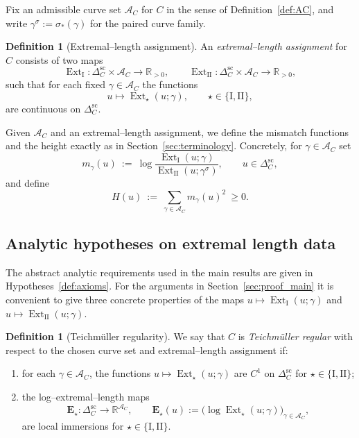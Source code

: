 \documentclass[a4paper,12pt]{amsart}
\newcommand{\R}{\mathbb{R}}
\DeclareMathOperator{\Ext}{Ext}
\theoremstyle{plain}
\theoremstyle{definition}
\newtheorem{definition}[theorem]{Definition}
\begin{document}
\noindent
Fix an admissible curve set $\mathcal A_C$ for $C$ in the sense of Definition~\ref{def:AC}, and write
$\gamma^\sigma:=\sigma_\ast(\gamma)$ for the paired curve family.


\begin{definition}[Extremal--length assignment]\label{def:ExtAssign}
An \emph{extremal--length assignment} for $C$ consists of two maps
\[
\Ext_{\mathrm{I}}:\Delta_C^{\mathrm{sc}}\times \mathcal A_C\longrightarrow \R_{>0},
\qquad
\Ext_{\mathrm{II}}:\Delta_C^{\mathrm{sc}}\times \mathcal A_C\longrightarrow \R_{>0},
\]
such that for each fixed $\gamma\in\mathcal A_C$ the functions
\[
u\longmapsto \Ext_{\star}(u;\gamma),\qquad \star\in\{\mathrm{I},\mathrm{II}\},
\]
are continuous on $\Delta_C^{\mathrm{sc}}$.
\end{definition}

Given $\mathcal A_C$ and an extremal--length assignment, we define the mismatch functions and the height exactly as in
Section~\ref{sec:terminology}.  Concretely, for $\gamma\in\mathcal A_C$ set
\[
m_\gamma(u)\ :=\ \log\frac{\Ext_{\mathrm{I}}(u;\gamma)}{\Ext_{\mathrm{II}}(u;\gamma^\sigma)},
\qquad u\in\Delta_C^{\mathrm{sc}},
\]
and define
\[
H(u)\ :=\ \sum_{\gamma\in\mathcal A_C} m_\gamma(u)^2\ \ge 0 .
\]

\subsection{Analytic hypotheses on extremal length data}\label{subsec:C_axioms}

The abstract analytic requirements used in the main results are given in Hypotheses~\ref{def:axioms}.
For the arguments in Section~\ref{sec:proof_main} it is convenient to give three concrete properties of the maps
$u\mapsto \Ext_{\mathrm{I}}(u;\gamma)$ and $u\mapsto \Ext_{\mathrm{II}}(u;\gamma)$.

\begin{definition}[Teichm\"uller regularity]\label{def:TeichReg}
We say that $C$ is \emph{Teichm\"uller regular} with respect to the chosen curve set and extremal--length assignment if:
\begin{enumerate}[label=\textup{(R\arabic*)}, leftmargin=2.8em]
\item for each $\gamma\in\mathcal A_C$, the functions $u\longmapsto \Ext_{\star}(u;\gamma)$ are $C^1$ on $\Delta_C^{\mathrm{sc}}$ for
$\star\in\{\mathrm{I},\mathrm{II}\}$;
\item the log--extremal--length maps
\[
\mathbf{E}_{\star}:\Delta_C^{\mathrm{sc}}\longrightarrow \R^{\mathcal A_C},\qquad
\mathbf{E}_{\star}(u):=\bigl(\log \Ext_{\star}(u;\gamma)\bigr)_{\gamma\in\mathcal A_C},
\]
are local immersions for $\star\in\{\mathrm{I},\mathrm{II}\}$.
\end{enumerate}
\end{definition}
\end{document}
